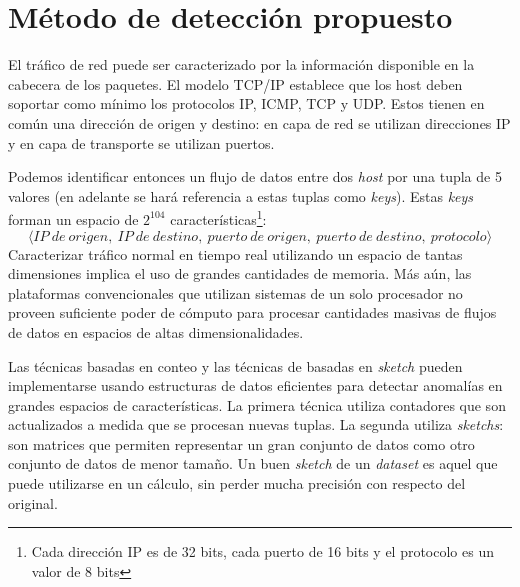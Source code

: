\documentclass[a4paper,10pt, oneside]{article}
\begin{document}
\section{Método de detección propuesto}
El tráfico de red puede ser caracterizado por la información disponible en la cabecera de los paquetes. El modelo TCP/IP establece que los host deben soportar como mínimo los protocolos IP, ICMP, TCP y UDP\cite{rfc1122}. Estos tienen en común una dirección de origen y destino: en capa de red se utilizan direcciones IP\cite{rfc791} y en capa de transporte se utilizan puertos\cite{rfc768}\cite{rfc793}. \par

Podemos identificar entonces un flujo de datos entre dos \textit{host} por una tupla de 5 valores (en adelante se hará referencia a estas tuplas como \textit{keys}). Estas \textit{keys} forman un espacio de $2^{104}$ características\footnote{Cada dirección IP es de 32 bits, cada puerto de 16 bits y el protocolo es un valor de 8 bits}:
\[\langle IP\ de\ origen,\ IP\ de\ destino,\ puerto\ de\ origen,\ puerto\ de\ destino,\ protocolo \rangle\]
Caracterizar tráfico normal en tiempo real utilizando un espacio de tantas dimensiones implica el uso de grandes cantidades de memoria. Más aún, las plataformas convencionales que utilizan sistemas de un solo procesador no proveen suficiente poder de cómputo para procesar cantidades masivas de flujos de datos en espacios de altas dimensionalidades. \par
Las técnicas basadas en conteo y las técnicas de basadas en \textit{sketch}\cite{krishnamurthy2003sketch}\cite{muthukrishnan2005data} pueden implementarse usando estructuras de datos eficientes para detectar anomalías en grandes espacios de características\cite{huang2014ld}. La primera técnica utiliza contadores que son actualizados a medida que se procesan nuevas tuplas. La segunda utiliza \textit{sketchs}: son matrices que permiten representar un gran conjunto de datos como otro conjunto de datos de menor tamaño. Un buen \textit{sketch} de un \textit{dataset} es aquel que puede utilizarse en un cálculo, sin perder mucha precisión con respecto del original\cite{liberty2013simple}.
\par
\end{document}
